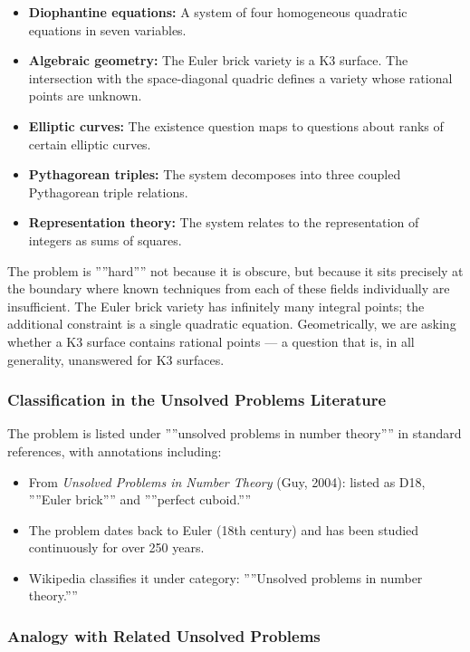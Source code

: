 \documentclass[10pt,a4paper]{article}
\begin{document}
\begin{itemize}
    \item \textbf{Diophantine equations:} A system of four homogeneous quadratic equations in seven variables.
    \item \textbf{Algebraic geometry:} The Euler brick variety is a K3 surface. The intersection with the space-diagonal quadric defines a variety whose rational points are unknown.
    \item \textbf{Elliptic curves:} The existence question maps to questions about ranks of certain elliptic curves.
    \item \textbf{Pythagorean triples:} The system decomposes into three coupled Pythagorean triple relations.
    \item \textbf{Representation theory:} The system relates to the representation of integers as sums of squares.
\end{itemize}

The problem is ''''hard'''' not because it is obscure, but because it sits precisely at the boundary where known techniques from each of these fields individually are insufficient. The Euler brick variety has infinitely many integral points; the additional constraint is a single quadratic equation. Geometrically, we are asking whether a K3 surface contains rational points --- a question that is, in all generality, unanswered for K3 surfaces.

\subsubsection{Classification in the Unsolved Problems Literature}

The problem is listed under ''''unsolved problems in number theory'''' in standard references, with annotations including:

\begin{itemize}
    \item From \emph{Unsolved Problems in Number Theory} (Guy, 2004): listed as D18, ''''Euler brick'''' and ''''perfect cuboid.''''
    \item The problem dates back to Euler (18th century) and has been studied continuously for over 250 years.
    \item Wikipedia classifies it under category: ''''Unsolved problems in number theory.''''
\end{itemize}

\subsubsection{Analogy with Related Unsolved Problems}
\end{document}
